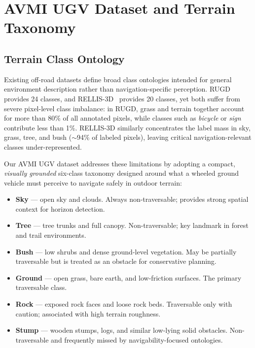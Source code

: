 
\section{AVMI UGV Dataset and Terrain Taxonomy}
\label{sec:dataset}

\subsection{Terrain Class Ontology}

Existing off-road datasets define broad class ontologies intended for general
environment description rather than navigation-specific perception.  RUGD~\cite{rugd2019}
provides 24 classes, and RELLIS-3D~\cite{rellis2021} provides 20 classes, yet both
suffer from severe pixel-level class imbalance: in RUGD, grass and terrain
together account for more than 80\% of all annotated pixels, while classes
such as \textit{bicycle} or \textit{sign} contribute less than 1\%.
RELLIS-3D similarly concentrates the label mass in sky, grass, tree, and
bush ($\sim$94\% of labeled pixels), leaving critical navigation-relevant
classes under-represented.

Our AVMI UGV dataset addresses these limitations by adopting a compact,
\emph{visually grounded} six-class taxonomy designed around what a wheeled
ground vehicle must perceive to navigate safely in outdoor terrain:

\begin{itemize}
    \item \textbf{Sky} --- open sky and clouds.  Always non-traversable;
          provides strong spatial context for horizon detection.
    \item \textbf{Tree} --- tree trunks and full canopy.  Non-traversable;
          key landmark in forest and trail environments.
    \item \textbf{Bush} --- low shrubs and dense ground-level vegetation.
          May be partially traversable but is treated as an obstacle for
          conservative planning.
    \item \textbf{Ground} --- open grass, bare earth, and low-friction
          surfaces.  The primary traversable class.
    \item \textbf{Rock} --- exposed rock faces and loose rock beds.
          Traversable only with caution; associated with high terrain
          roughness.
    \item \textbf{Stump} --- wooden stumps, logs, and similar low-lying
          solid obstacles.  Non-traversable and frequently missed by
          navigability-focused ontologies.
\end{itemize}

